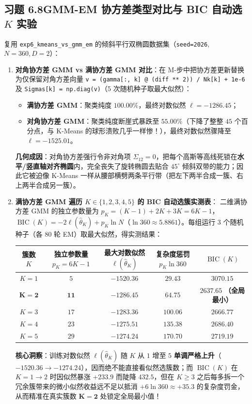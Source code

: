 \subsection*{习题 6.8\quad GMM-EM 协方差类型对比与 BIC 自动选 $K$ 实验}
复用 \texttt{exp6\_kmeans\_vs\_gmm\_em} 的倾斜平行双椭圆数据集（\texttt{seed=2026}, $N = 360, D = 2$）：
\begin{enumerate}[label=(\arabic*), leftmargin=1.8em]
  \item \textbf{对角协方差 GMM vs 满协方差 GMM 对比}：在 M-步中把协方差更新替换为仅保留对角方差向量 \texttt{v = (gamma[:, k] @ (diff ** 2)) / Nk[k] + 1e-6} 及 \texttt{Sigmas[k] = np.diag(v)}（5 次随机种子取最大似然）：
  \begin{itemize}
    \item \textbf{满协方差 GMM}：聚类纯度 $\mathbf{100.00\%}$，最终对数似然 $\ell = -1286.45$；
    \item \textbf{对角协方差 GMM}：聚类纯度断崖式暴跌至 $\mathbf{55.00\%}$（下降了整整 $45$ 个百分点，与 K-Means 的球形溃败几乎一样惨！），最终对数似然骤降至 $\ell = -1525.01$。
  \end{itemize}
  \textbf{几何成因}：对角协方差强行令非对角项 $\Sigma_{12} = 0$，把每个高斯等高线死锁在\textbf{水平/竖直轴对齐椭圆}内，完全丧失了旋转椭圆去贴合 $45^\circ$ 倾斜双带的能力；因此它被迫像 K-Means 一样从腰部横劈两条平行带（把左下两半合成一簇、右上两半合成另一簇）。

  \item \textbf{满协方差 GMM 遍历 $K \in \{1, 2, 3, 4, 5\}$ 的 BIC 自动选簇实测表}：
  二维满协方差 GMM 的独立参数量为 $p_K = (K-1) + 2K + 3K = 6K - 1$，$\operatorname{BIC}(K) = -2\ell(\hat{\theta}_K) + p_K \ln N$（$\ln 360 \approx 5.8861$）。每组运行 3 个随机种子（各 80 轮 EM）取最大似然，得实测结果：
  \begin{center}\small
  \begin{tabular}{@{}ccccc@{}}
    \toprule
    簇数 $K$ & 独立参数量 $p_K = 6K - 1$ & 最大对数似然 $\ell(\hat{\theta}_K)$ & 复杂度惩罚 $p_K\ln 360$ & $\operatorname{BIC}(K)$ \\
    \midrule
    $K = 1$ & $5$ & $-1520.36$ & $29.43$ & $3070.15$ \\
    $\mathbf{K = 2}$ & $\mathbf{11}$ & $\mathbf{-1286.45}$ & $\mathbf{64.75}$ & $\mathbf{2637.65}$ \textbf{（全局最小）} \\
    $K = 3$ & $17$ & $-1283.36$ & $100.06$ & $2666.77$ \\
    $K = 4$ & $23$ & $-1275.51$ & $135.38$ & $2686.40$ \\
    $K = 5$ & $29$ & $-1274.24$ & $170.70$ & $2719.19$ \\
    \bottomrule
  \end{tabular}
  \end{center}
  \textbf{核心洞察}：训练对数似然 $\ell(\hat{\theta}_K)$ 随 $K$ 从 $1$ 增至 $5$ \textbf{单调严格上升}（$-1520.36 \to -1274.24$），因而绝不能直接看似然选簇数；而 $\operatorname{BIC}(K)$ 在 $K=1 \to 2$ 时因似然暴涨 $+233.9$ 而陡降 $432.5$，但在 $K \ge 3$ 之后每多拆一个冗余簇带来的微小似然收益远不足以抵消 $+6\ln 360 \approx +35.3$ 的复杂度罚金，从而精准在真实簇数 $\mathbf{K = 2}$ 处锁定全局最小值！
\end{enumerate}
